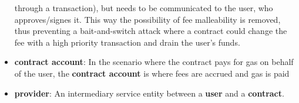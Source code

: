 \documentclass[twocolumn, nofootinbib]{revtex4-2}
\begin{document}
\begin{itemize}
              through a transaction), but needs to be communicated to the user,
              who approves/signes it.
              This way the possibility of fee malleability is removed, thus
              preventing a bait-and-switch attack where a contract could change
              the fee with a high priority transaction and drain the user's
              funds.
        \item \textbf{contract account}: In the scenario where the contract pays
              for gas on behalf of the user, the \textbf{contract account} is
              where fees are accrued and gas is paid
        \item \textbf{provider}: An intermediary service entity between a
              \textbf{user} and a \textbf{contract}.
    \end{itemize}
\end{document}

